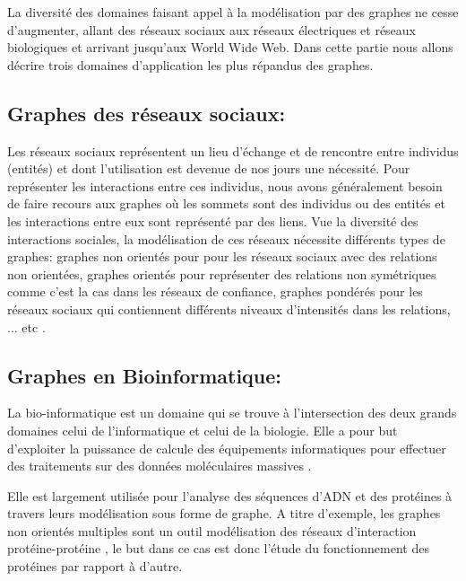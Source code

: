   La diversité des domaines faisant appel à la modélisation par des graphes ne cesse d'augmenter, allant des réseaux sociaux aux réseaux électriques et réseaux biologiques et arrivant jusqu'aux World Wide Web. Dans cette partie nous allons décrire trois domaines d'application les plus répandus des graphes.
	
		\subsection{Graphes des réseaux sociaux:}
		Les réseaux sociaux représentent un lieu d'échange et de rencontre entre individus (entités) et dont l'utilisation est devenue de nos jours une nécessité.  
		Pour représenter les interactions entre ces individus, nous avons généralement besoin de faire recours aux graphes où les sommets sont des individus ou des entités et les interactions entre eux sont représenté par des liens. 
		Vue la diversité des interactions sociales, la modélisation de ces réseaux  nécessite différents types de graphes: graphes non orientés pour pour les réseaux sociaux avec des relations non
orientées, graphes orientés pour représenter des relations non symétriques
comme c'est la cas dans les réseaux de confiance, graphes pondérés pour les réseaux sociaux qui contiennent différents niveaux d'intensités dans les relations, ... etc \citep{lemmouchi2012etude}.
		
		\subsection{Graphes en Bioinformatique:}
		
		La bio-informatique est un domaine qui se trouve à l'intersection des deux grands domaines celui de l'informatique et celui de la biologie. Elle a pour but d'exploiter la puissance de calcule des équipements informatiques pour effectuer des traitements sur des données moléculaires massives \citep{pellegrini2004protein}.
		
		Elle est largement utilisée pour l’analyse des séquences d’ADN et des protéines à travers leurs modélisation sous forme de graphe. A titre d'exemple, les graphes non orientés multiples sont un outil modélisation des réseaux d’interaction protéine-protéine \citep{pellegrini2004protein}, 
		le but dans ce cas est donc l'étude du fonctionnement des protéines par rapport à d'autre.
		
